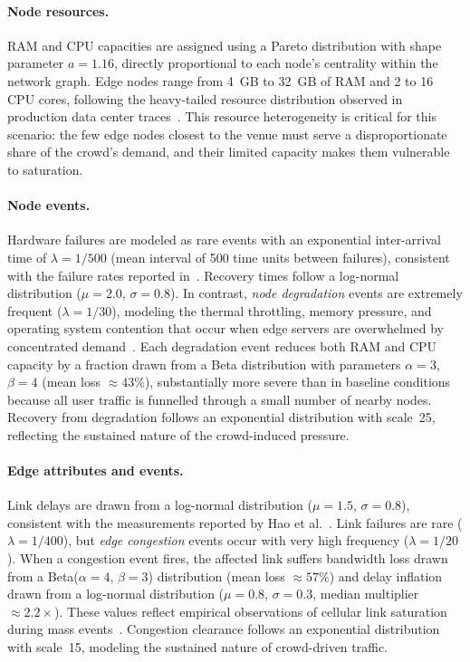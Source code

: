 \paragraph{Node resources.} RAM and CPU capacities are assigned using a Pareto distribution with shape parameter $a = 1.16$, directly proportional to each node's centrality within the network graph. Edge nodes range from 4~GB to 32~GB of RAM and 2 to 16 CPU cores, following the heavy-tailed resource distribution observed in production data center traces~\cite{Reiss2012Heterogeneity}. This resource heterogeneity is critical for this scenario: the few edge nodes closest to the venue must serve a disproportionate share of the crowd's demand, and their limited capacity makes them vulnerable to saturation.

\paragraph{Node events.} Hardware failures are modeled as rare events with an exponential inter-arrival time of $\lambda = 1/500$ (mean interval of 500 time units between failures), consistent with the failure rates reported in~\cite{Gill2011Understanding}. Recovery times follow a log-normal distribution ($\mu = 2.0$, $\sigma = 0.8$). In contrast, \emph{node degradation} events are extremely frequent ($\lambda = 1/30$), modeling the thermal throttling, memory pressure, and operating system contention that occur when edge servers are overwhelmed by concentrated demand~\cite{Bantock2020Mitigating, Xu2018Fail}. Each degradation event reduces both RAM and CPU capacity by a fraction drawn from a Beta distribution with parameters $\alpha = 3$, $\beta = 4$ (mean loss $\approx 43\%$), substantially more severe than in baseline conditions because all user traffic is funnelled through a small number of nearby nodes. Recovery from degradation follows an exponential distribution with scale~25, reflecting the sustained nature of the crowd-induced pressure.

\paragraph{Edge attributes and events.} Link delays are drawn from a log-normal distribution ($\mu = 1.5$, $\sigma = 0.8$), consistent with the measurements reported by Hao et al.~\cite{Hao2010Optimal}. Link failures are rare ($\lambda = 1/400$), but \emph{edge congestion} events occur with very high frequency ($\lambda = 1/20$). When a congestion event fires, the affected link suffers bandwidth loss drawn from a Beta($\alpha = 4$, $\beta = 3$) distribution (mean loss $\approx 57\%$) and delay inflation drawn from a log-normal distribution ($\mu = 0.8$, $\sigma = 0.3$, median multiplier $\approx 2.2\times$). These values reflect empirical observations of cellular link saturation during mass events~\cite{Shafiq2013First, Zhang2022Optimal}. Congestion clearance follows an exponential distribution with scale~15, modeling the sustained nature of crowd-driven traffic.

